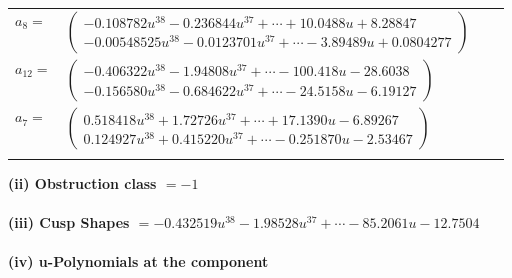 \documentclass[1p]{elsarticle_modified}
\theoremstyle{definition}
\begin{document}
\begin{tabular}{m{7pt} m{180pt} m{7pt} m{180pt} }
\flushright $a_{8}=$&$\begin{pmatrix}-0.108782 u^{38}-0.236844 u^{37}+\cdots+10.0488 u+8.28847\\-0.00548525 u^{38}-0.0123701 u^{37}+\cdots-3.89489 u+0.0804277\end{pmatrix}$ \\
\flushright $a_{12}=$&$\begin{pmatrix}-0.406322 u^{38}-1.94808 u^{37}+\cdots-100.418 u-28.6038\\-0.156580 u^{38}-0.684622 u^{37}+\cdots-24.5158 u-6.19127\end{pmatrix}$ \\
\flushright $a_{7}=$&$\begin{pmatrix}0.518418 u^{38}+1.72726 u^{37}+\cdots+17.1390 u-6.89267\\0.124927 u^{38}+0.415220 u^{37}+\cdots-0.251870 u-2.53467\end{pmatrix}$\\&\end{tabular}
\flushleft \textbf{(ii) Obstruction class $= -1$}\\~\\
\flushleft \textbf{(iii) Cusp Shapes $= -0.432519 u^{38}-1.98528 u^{37}+\cdots-85.2061 u-12.7504$}\\~\\
\newpage\renewcommand{\arraystretch}{1}
\flushleft \textbf{(iv) u-Polynomials at the component}\newline \\
\end{document}
